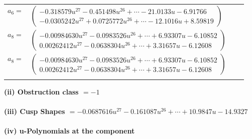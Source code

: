 \documentclass[1p]{elsarticle_modified}
\theoremstyle{definition}
\begin{document}
\begin{tabular}{m{7pt} m{180pt} m{7pt} m{180pt} }
\flushright $a_{6}=$&$\begin{pmatrix}-0.318579 u^{27}-0.451498 u^{26}+\cdots-21.0133 u-6.91766\\-0.0305242 u^{27}+0.0725772 u^{26}+\cdots-12.1016 u+8.59819\end{pmatrix}$ \\
\flushright $a_{8}=$&$\begin{pmatrix}-0.00984630 u^{27}-0.0983526 u^{26}+\cdots+6.93307 u-6.10852\\0.00262412 u^{27}-0.0638304 u^{26}+\cdots+3.31657 u-6.12608\end{pmatrix}$\\ \flushright $a_{8}=$&$\begin{pmatrix}-0.00984630 u^{27}-0.0983526 u^{26}+\cdots+6.93307 u-6.10852\\0.00262412 u^{27}-0.0638304 u^{26}+\cdots+3.31657 u-6.12608\end{pmatrix}$\\&\end{tabular}
\flushleft \textbf{(ii) Obstruction class $= -1$}\\~\\
\flushleft \textbf{(iii) Cusp Shapes $= -0.0687616 u^{27}-0.161087 u^{26}+\cdots+10.9847 u-14.9327$}\\~\\
\newpage\renewcommand{\arraystretch}{1}
\flushleft \textbf{(iv) u-Polynomials at the component}\newline \\
\end{document}
